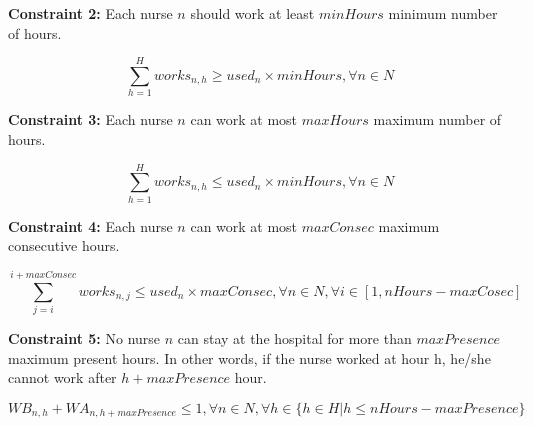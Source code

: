 \documentclass{article}
\newcommand\tab[1][1cm]{\hspace*{#1}}
\begin{document}
\begin{minipage}{\linewidth}
\tab \caption{\textbf{Constraint 2:} Each nurse $n$ should work at least $minHours$ minimum number of hours.}
	\begin{equation}
		\sum_{h=1}^H works_{n,h} \geq used_n \times minHours, \forall n \in N
	\end{equation}
\end{minipage}

\begin{minipage}{\linewidth}
\tab \caption{\textbf{Constraint 3:} Each nurse $n$ can work at most $maxHours$ maximum number of hours.}
	\begin{equation}
		\sum_{h=1}^H works_{n,h} \leq used_n \times minHours, \forall n \in N
	\end{equation}
\end{minipage}

\begin{minipage}{\linewidth}
\tab \caption{\textbf{Constraint 4:} Each nurse $n$ can work at most $maxConsec$ maximum consecutive hours.}
	\begin{equation}
		\sum_{j=i}^{i+maxConsec} works_{n,j} \leq used_n \times maxConsec, \forall n \in N, \forall i \in [1,nHours-maxCosec]
	\end{equation}
\end{minipage}

\begin{minipage}{\linewidth}
\tab \caption{\textbf{Constraint 5:} No nurse $n$ can stay at the hospital for more than $maxPresence$ maximum present hours. In other words, if the nurse worked at hour h, he/she cannot work after $h+maxPresence$ hour.}
	\begin{equation}
		WB_{n,h} + WA_{n,h+maxPresence} \leq 1, \forall n \in N, \forall h \in \{h \in H|h \leq nHours-maxPresence \}
	\end{equation}
\end{minipage}
\end{document}
